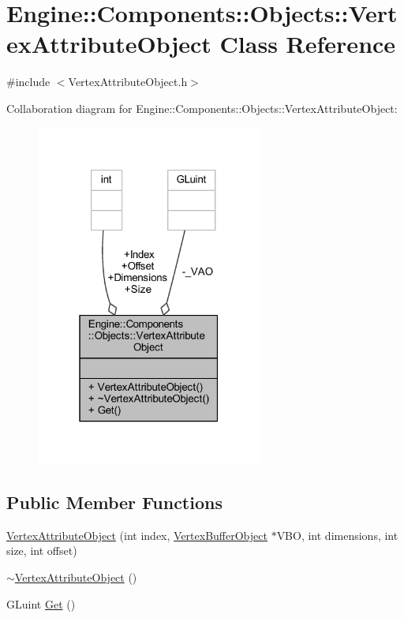 \hypertarget{classEngine_1_1Components_1_1Objects_1_1VertexAttributeObject}{}\section{Engine\+:\+:Components\+:\+:Objects\+:\+:Vertex\+Attribute\+Object Class Reference}
\label{classEngine_1_1Components_1_1Objects_1_1VertexAttributeObject}


{\ttfamily \#include $<$Vertex\+Attribute\+Object.\+h$>$}



Collaboration diagram for Engine\+:\+:Components\+:\+:Objects\+:\+:Vertex\+Attribute\+Object\+:
\nopagebreak
\begin{figure}[H]
\begin{center}
\leavevmode
\includegraphics[width=211pt]{classEngine_1_1Components_1_1Objects_1_1VertexAttributeObject__coll__graph}
\end{center}
\end{figure}
\subsection*{Public Member Functions}
\begin{DoxyCompactItemize}
\item 
\mbox{\hyperlink{classEngine_1_1Components_1_1Objects_1_1VertexAttributeObject_a1439a87dfc4f350a31e97a40a5cc1c3d}{Vertex\+Attribute\+Object}} (int index, \mbox{\hyperlink{classEngine_1_1Components_1_1Objects_1_1VertexBufferObject}{Vertex\+Buffer\+Object}} $\ast$V\+BO, int dimensions, int size, int offset)
\item 
\mbox{\hyperlink{classEngine_1_1Components_1_1Objects_1_1VertexAttributeObject_afab852c51905d30eba2c9e470fe621aa}{$\sim$\+Vertex\+Attribute\+Object}} ()
\item 
G\+Luint \mbox{\hyperlink{classEngine_1_1Components_1_1Objects_1_1VertexAttributeObject_aa67306f65eb1377693630b05bae4fa70}{Get}} ()
\end{DoxyCompactItemize}
